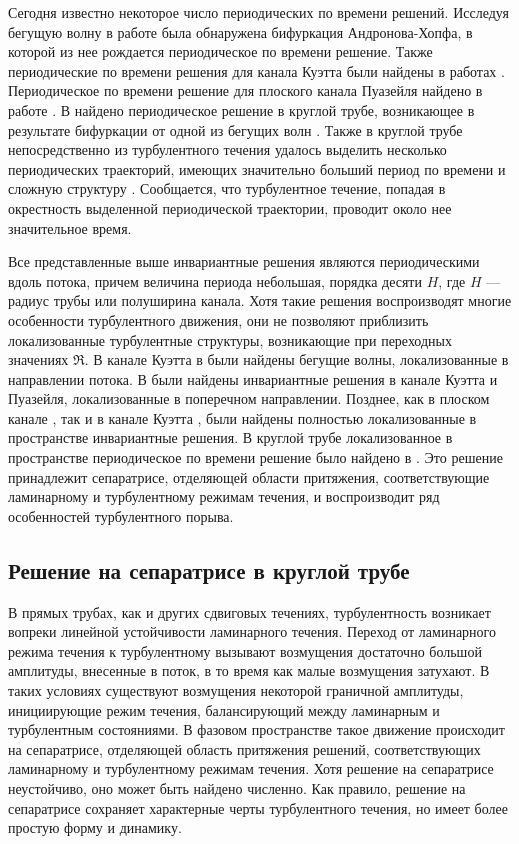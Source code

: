 Сегодня известно некоторое число периодических по времени решений. Исследуя бегущую волну \cite{Nagata1990} в работе \cite{Clever1997} была обнаружена бифуркация Андронова-Хопфа, в которой из нее рождается периодическое по времени решение. Также периодические по времени решения для канала Куэтта были найдены в работах \cite{Kawahara2001, Viswanath2007}. Периодическое по времени решение для плоского канала Пуазейля найдено в работе \cite{Toh2003}. В \cite{Duguet2008} найдено периодическое решение в круглой трубе, возникающее в результате бифуркации от одной из бегущих волн \cite{Pringle2007}. Также в круглой трубе непосредственно из турбулентного течения удалось выделить несколько периодических траекторий, имеющих значительно больший период по времени и сложную структуру \cite{Altmeyer2015}. Сообщается, что турбулентное течение, попадая в окрестность выделенной периодической траектории, проводит около нее значительное время. 

Все представленные выше инвариантные решения являются периодическими вдоль потока, причем величина периода небольшая, порядка десяти $H$, где $H$ --- радиус трубы или полуширина канала. Хотя такие решения воспроизводят многие особенности турбулентного движения, они не позволяют приблизить локализованные турбулентные структуры, возникающие при переходных значениях $\Re$. В канале Куэтта в \cite{Cherhabili1997, Ehrenstein2008, Schneider2010} были найдены бегущие волны, локализованные в направлении потока. В \cite{Gibson2014} были найдены инвариантные решения в канале Куэтта и Пуазейля, локализованные в поперечном направлении. Позднее, как в плоском канале \cite{Zammert2014}, так и в канале Куэтта \cite{Brand2014}, были найдены полностью локализованные в пространстве инвариантные решения. В круглой трубе локализованное в пространстве периодическое по времени решение было найдено в \cite{Avila2013}. Это решение принадлежит сепаратрисе, отделяющей области притяжения, соответствующие ламинарному и турбулентному режимам течения, и воспроизводит ряд особенностей турбулентного порыва. 


	\subsection{Решение на сепаратрисе в круглой трубе}

В прямых трубах, как и других сдвиговых течениях, турбулентность возникает вопреки линейной устойчивости ламинарного течения. Переход от ламинарного режима течения к турбулентному вызывают возмущения достаточно большой амплитуды, внесенные в поток, в то время как малые возмущения затухают. В таких условиях существуют возмущения некоторой граничной амплитуды, инициирующие режим течения, балансирующий между ламинарным и турбулентным состояниями. В фазовом пространстве такое движение происходит на сепаратрисе, отделяющей область притяжения решений, соответствующих ламинарному и турбулентному режимам течения. Хотя решение на сепаратрисе неустойчиво, оно может быть найдено численно. Как правило, решение на сепаратрисе сохраняет характерные черты турбулентного течения, но имеет более простую форму и динамику.

